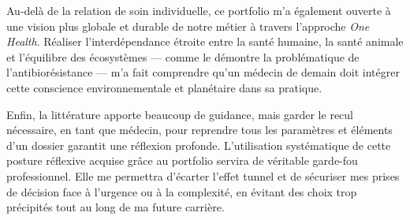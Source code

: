 Au-delà de la relation de soin individuelle, ce portfolio m'a également ouverte à une vision plus globale et durable de notre métier à travers l'approche \textit{One Health}. Réaliser l'interdépendance étroite entre la santé humaine, la santé animale et l'équilibre des écosystèmes — comme le démontre la problématique de l'antibiorésistance — m'a fait comprendre qu'un médecin de demain doit intégrer cette conscience environnementale et planétaire dans sa pratique.

Enfin, la littérature apporte beaucoup de guidance, mais garder le recul nécessaire, en tant que médecin, pour reprendre tous les paramètres et éléments d'un dossier garantit une réflexion profonde. L'utilisation systématique de cette posture réflexive acquise grâce au portfolio servira de véritable garde-fou professionnel. Elle me permettra d'écarter l'effet tunnel et de sécuriser mes prises de décision face à l'urgence ou à la complexité, en évitant des choix trop précipités tout au long de ma future carrière. 

\leavevmode{}\label{retour:radio_patient}
